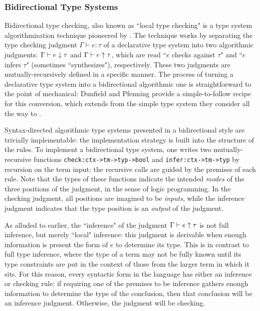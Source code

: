 \subsubsection{Bidirectional Type Systems}
\label{sec:bilambdaamor-overview-bidir}
Bidirectional type checking, also known as ``local type checking" is a type system algorithmization technique pioneered by . The technique works by separating the type checking judgment $\Gamma \vdash e : \tau$ of a declarative type system into two algorithmic judgments: $\Gamma \vdash e \downarrow \tau$ and $\Gamma \vdash e \uparrow  \tau$, which are read ``$e$ checks against $\tau$" and ``$e$ infers $\tau$" (sometimes ``synthesizes"), respectively. These two judgments are mutually-recursively defined in a specific manner. The process of turning a declarative type system into a bidirectional algorithmic one is straightforward to the point of mechanical: Dunfield and Pfenning \citehere provide a simple-to-follow recipe for this conversion, which extends from the simple type system they consider all the way to \dlambdaamor. 

Syntax-directed algorithmic type systems presented in a bidirectional style are trivially implementable: the implementation strategy is built into the structure of the rules. To implement a bidirectional type system, one writes two mutually-recursive functions \texttt{check:ctx->tm->typ->bool} and \texttt{infer:ctx->tm->typ} by recursion on the term input: the recursive calls are guided by the premises of each rule. Note that the types of these functions indicate the intended \textit{modes} of the three positions of the judgment, in the sense of logic programming. In the checking judgment, all positions are imagined to be \textit{inputs}, while the inference judgment indicates that the type position is an \textit{output} of the judgment.

As alluded to earlier, the ``inference" of the judgment $\Gamma \vdash e \uparrow \tau$ is not full inference, but merely ``local" inference: this judgment is derivable when enough information is present the form of $e$ to determine its type. This is in contrast to full type inference, where the type of a term may not be fully known until its type constraints are put in the context of those from the larger term in which it sits. For this reason, every syntactic form in the language has either an inference or checking rule: if requiring one of the premises to be inference gathers enough information to determine the type of the conclusion, then that conclusion will be an inference judgment. Otherwise, the judgment will be checking.

